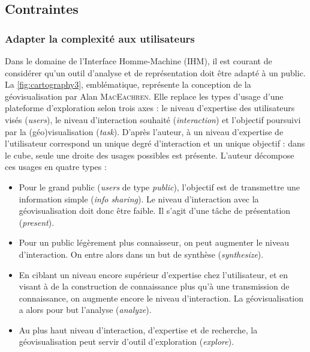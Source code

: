 \subsection{Contraintes}

\subsubsection{Adapter la complexité aux utilisateurs}

Dans le domaine de l'Interface Homme-Machine (IHM), il est courant de considérer qu'un outil d'analyse et de représentation doit être adapté à un public.
La \cref{fig:cartography3}, emblématique, représente la conception de la géovisualisation par Alan \textsc{MacEachren}.
Elle replace les types d'usage d'une plateforme d'exploration selon trois axes : le niveau d'expertise des utilisateurs visés (\textit{users}), le niveau d'interaction souhaité (\textit{interaction}) et l'objectif poursuivi par la (géo)visu\-alisation (\textit{task}).
D'après l'auteur, à un niveau d'expertise de l'utilisateur correspond un unique degré d'interaction et un unique objectif : dans le cube, seule une \og droite\fg{} des usages possibles est présente.
L'auteur décompose ces usages en quatre types :
\begin{itemize}
	\item Pour le grand public (\textit{users} de type \textit{public}), l'objectif est de transmettre une information simple (\textit{info sharing}). Le niveau d'interaction avec la géovisualisation doit donc être faible. Il s'agit d'une tâche de présentation (\textit{present}).
	\item Pour un public légèrement plus connaisseur, on peut augmenter le niveau d'interaction. On entre alors dans un but de synthèse (\textit{synthesize}).
	\item En ciblant un niveau encore supérieur d'expertise chez l'utilisateur, et en visant à de la construction de connaissance plus qu'à une transmission de connaissance, on augmente encore le niveau d'interaction.
	La géovisualisation a alors pour but l'analyse (\textit{analyze}).
	\item Au plus haut niveau d'interaction, d'expertise et de recherche, la géovisualisation peut servir d'outil d'exploration (\textit{explore}).
\end{itemize}

